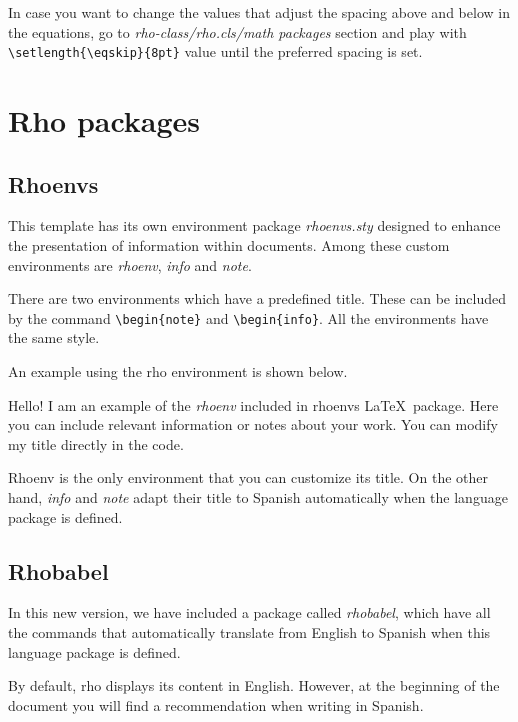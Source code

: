 \documentclass[9pt,a4paper,twoside]{rho-class/rho}
\begin{document}
    In case you want to change the values that adjust the spacing above and below in the equations, go to \textit{rho-class/rho.cls/math packages} section and play with \verb|\setlength{\eqskip}{8pt}| value until the preferred spacing is set.

\section{Rho packages}

    \subsection{Rhoenvs}
    
        This template has its own environment package \textit{rhoenvs.sty} designed to enhance the presentation of information within documents. Among these custom environments are \textit{rhoenv}, \textit{info} and \textit{note}.
    
        There are two environments which have a predefined title. These can be included by the command \verb|\begin{note}| and \verb|\begin{info}|. All the environments have the same style.
    	
        An example using the rho environment is shown below.
    
        \begin{rhoenv}[frametitle=Environment with custom title]
            Hello! I am an example of the \textit{rhoenv} included in rhoenvs \LaTeX\ package. Here you can include relevant information or notes about your work. You can modify my title directly in the code.
        \end{rhoenv}
    
        Rhoenv is the only environment that you can customize its title. On the other hand, \textit{info} and \textit{note} adapt their title to Spanish automatically when the language package is defined.

    \subsection{Rhobabel}

        In this new version, we have included a package called \textit{rhobabel}, which have all the commands that automatically translate from English to Spanish when this language package is defined. 
        
        By default, rho displays its content in English. However, at the beginning of the document you will find a recommendation when writing in Spanish. 
		
\end{document}
